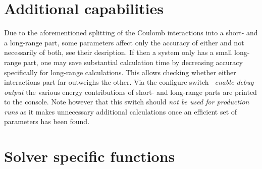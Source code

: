 \section*{Additional capabilities}

 Due to the aforementioned splitting of the Coulomb interactions into a short- and a long-range part, some parameters affect only the accuracy of either and not necessarily of both, see their desription. If then a system only has a small long-range part, one may save substantial calculation time by decreasing accuracy specifically for long-range calculations. This allows checking whether either interactions part far outweighs the other.
 Via the configure switch \emph{--enable-debug-output} the various energy contributions of short- and long-range parts are printed to the console. Note however that this switch should \emph{not be used for production runs} as it makes unnecessary additional calculations once an efficient set of parameters has been found.



\section*{Solver specific functions}

